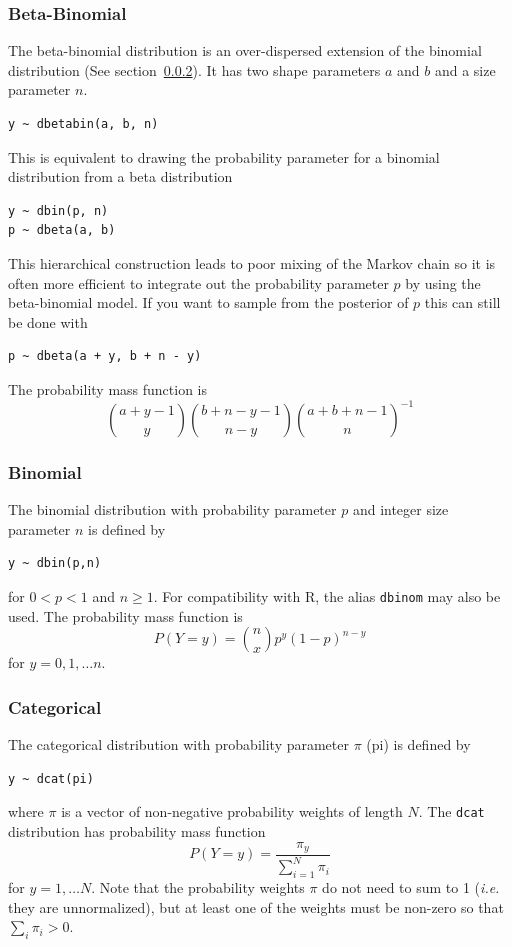 \documentclass[11pt, a4paper, titlepage]{report}
\newcommand{\R}{\textsf{R}}
\begin{document}
{\subsubsection{Beta-Binomial}
\label{bugs:dbetabin}

The beta-binomial distribution is an over-dispersed extension of the binomial
distribution (See section~\ref{bugs:dbin}). It has two shape parameters $a$
and $b$ and a size parameter $n$.
\begin{verbatim}
y ~ dbetabin(a, b, n)
\end{verbatim}
This is equivalent to drawing the probability parameter for a binomial
distribution from a beta distribution
\begin{verbatim}
y ~ dbin(p, n)
p ~ dbeta(a, b)
\end{verbatim}
This hierarchical construction leads to poor mixing of the Markov
chain so it is often more efficient to integrate out the probability
parameter $p$ by using the beta-binomial model. If you want to sample
from the posterior of $p$ this can still be done with
\begin{verbatim}
p ~ dbeta(a + y, b + n - y)
\end{verbatim}

The probability mass function is
\[
{a+y-1 \choose y} {b+n-y-1 \choose n - y} {a+b+n-1 \choose n}^{-1}
\]

\subsubsection{Binomial}
\label{bugs:dbin}

The binomial distribution with probability parameter $p$ and integer
size parameter $n$ is defined by
\begin{verbatim}
y ~ dbin(p,n)
\end{verbatim}
for $0 < p < 1$ and $n \geq 1$. For compatibility with \R, the alias
\texttt{dbinom} may also be used. The probability mass function is
\[
P(Y=y) = {n \choose x}  p^y (1-p)^{n-y}
\]
for $y = 0, 1, \ldots n$.

\subsubsection{Categorical}

The categorical distribution with probability parameter $\pi$ (pi) is
defined by
\begin{verbatim}
y ~ dcat(pi)
\end{verbatim}
where $\pi$ is a vector of non-negative probability weights of
length $N$. The \texttt{dcat} distribution has probability mass
function
\[
P(Y=y) = \frac{\pi_y}{\sum_{i=1}^N \pi_i}
\]
for $y = 1, \ldots N$. Note that the probability weights $\pi$ do not
need to sum to 1 ({\em i.e.} they are unnormalized), but at least one
of the weights must be non-zero so that $\sum_i \pi_i > 0$.

}
\end{document}
